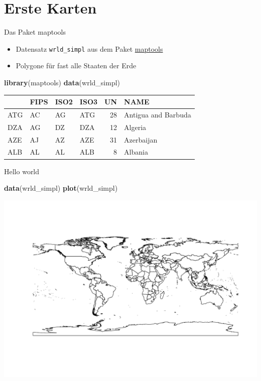 \documentclass[ignorenonframetext,]{beamer}
\newenvironment{Shaded}{\begin{snugshade}}{\end{snugshade}}
\newcommand{\KeywordTok}[1]{\textcolor[rgb]{0.26,0.66,0.93}{\textbf{#1}}}
\newcommand{\NormalTok}[1]{\textcolor[rgb]{0.74,0.68,0.62}{#1}}
\providecommand{\tightlist}{%
  \setlength{\itemsep}{0pt}\setlength{\parskip}{0pt}}
\begin{document}
\hypertarget{erste-karten}{%
\section{Erste Karten}\label{erste-karten}}

\begin{frame}[fragile]{Das Paket maptools}
\protect\hypertarget{das-paket-maptools}{}

\begin{itemize}
\tightlist
\item
  Datensatz \texttt{wrld\_simpl} aus dem Paket
  \href{https://cran.r-project.org/web/packages/maptools/index.html}{maptools}
\item
  Polygone für fast alle Staaten der Erde
\end{itemize}

\begin{Shaded}
\begin{Highlighting}[]
\KeywordTok{library}\NormalTok{(maptools)}
\KeywordTok{data}\NormalTok{(wrld_simpl)}
\end{Highlighting}
\end{Shaded}

\begin{longtable}[]{@{}llllrl@{}}
\toprule
& FIPS & ISO2 & ISO3 & UN & NAME\tabularnewline
\midrule
\endhead
ATG & AC & AG & ATG & 28 & Antigua and Barbuda\tabularnewline
DZA & AG & DZ & DZA & 12 & Algeria\tabularnewline
AZE & AJ & AZ & AZE & 31 & Azerbaijan\tabularnewline
ALB & AL & AL & ALB & 8 & Albania\tabularnewline
\bottomrule
\end{longtable}

\end{frame}

\begin{frame}[fragile]{Hello world}
\protect\hypertarget{hello-world}{}

\begin{Shaded}
\begin{Highlighting}[]
\KeywordTok{data}\NormalTok{(wrld_simpl)}
\KeywordTok{plot}\NormalTok{(wrld_simpl)}
\end{Highlighting}
\end{Shaded}

\includegraphics{Geomedizin_files/figure-beamer/unnamed-chunk-62-1.pdf}

\end{frame}
\end{document}
